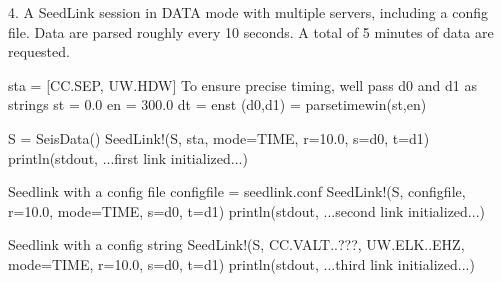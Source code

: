 \documentclass[letterpaper,11pt,english]{sphinxmanual}
\begin{document}
4. A SeedLink session in DATA mode with multiple servers, including a config file. Data are parsed roughly every 10 seconds. A total of 5 minutes of data are requested.

%
\begin{sphinxVerbatim}[commandchars=\\\{\}]
sta = [\PYGZdq{}CC.SEP\PYGZdq{}, \PYGZdq{}UW.HDW\PYGZdq{}]
\PYGZsh{} To ensure precise timing, we\PYGZsq{}ll pass d0 and d1 as strings
st = 0.0
en = 300.0
dt = en\PYGZhy{}st
(d0,d1) = parsetimewin(st,en)

S = SeisData()
SeedLink!(S, sta, mode=\PYGZdq{}TIME\PYGZdq{}, r=10.0, s=d0, t=d1)
println(stdout, \PYGZdq{}...first link initialized...\PYGZdq{})

\PYGZsh{} Seedlink with a config file
config\PYGZus{}file = \PYGZdq{}seedlink.conf\PYGZdq{}
SeedLink!(S, config\PYGZus{}file, r=10.0, mode=\PYGZdq{}TIME\PYGZdq{}, s=d0, t=d1)
println(stdout, \PYGZdq{}...second link initialized...\PYGZdq{})

\PYGZsh{} Seedlink with a config string
SeedLink!(S, \PYGZdq{}CC.VALT..???, UW.ELK..EHZ\PYGZdq{}, mode=\PYGZdq{}TIME\PYGZdq{}, r=10.0, s=d0, t=d1)
println(stdout, \PYGZdq{}...third link initialized...\PYGZdq{})
\end{sphinxVerbatim}



\renewcommand{\indexname}{Index}
\printindex
\end{document}
